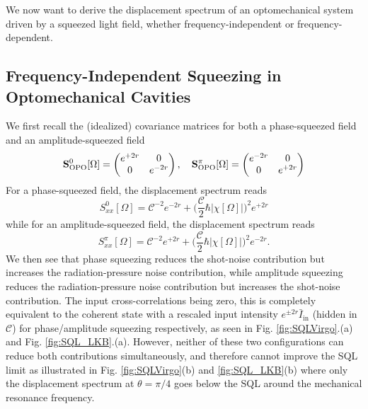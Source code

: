 We now want to derive the displacement spectrum of an optomechanical system driven by a squeezed light field, whether frequency-independent or frequency-dependent. 

\subsection{Frequency-Independent Squeezing in Optomechanical Cavities}
We first recall the (idealized) covariance matrices for both a phase-squeezed field and an amplitude-squeezed field 
\begin{equation*}
  \mathbf{S}^{0}_{\rm OPO}[\Omega] = 
  \begin{pmatrix}
    e^{+2r} & 0\\
    0 & e^{-2r}
  \end{pmatrix}, \quad
  \mathbf{S}^{\pi}_{\rm OPO}[\Omega] = 
  \begin{pmatrix}
    e^{-2r} & 0\\
    0 & e^{+2r}
  \end{pmatrix}
\end{equation*}
For a phase-squeezed field, the displacement spectrum reads
\begin{equation}
  S_{xx}^{0}[\Omega] =   \mathcal{C}^{-2}  e^{-2r} + \bigg(\dfrac{\mathcal{C} }{2} \hbar |\chi[\Omega]| \bigg)^2 e^{+2r}
\end{equation}
while for an amplitude-squeezed field, the displacement spectrum reads
\begin{equation}
  S_{xx}^{\pi}[\Omega] =  \mathcal{C}^{-2}  e^{+2r} + \bigg(\dfrac{\mathcal{C} }{2} \hbar |\chi[\Omega]| \bigg)^2 e^{-2r}.
\end{equation}
We then see that phase squeezing reduces the shot-noise contribution but increases the radiation-pressure noise contribution, while amplitude squeezing reduces the radiation-pressure noise contribution but increases the shot-noise contribution. The input cross-correlations being zero, this is completely equivalent to the coherent state with a rescaled input intensity $e^{\pm 2r} \bar{I}_\mathrm{in} $ (hidden in $\mathcal{C}$) for phase/amplitude squeezing respectively, as seen in Fig. \ref{fig:SQLVirgo}.(a) and Fig. \ref{fig:SQL_LKB}.(a). However, neither of these two configurations can reduce both contributions simultaneously, and therefore cannot improve the SQL limit as illustrated in Fig. \ref{fig:SQLVirgo}(b) and \ref{fig:SQL_LKB}(b) where only the displacement spectrum at $\theta=\pi/4$ goes below the SQL around the mechanical resonance frequency. \\ 

